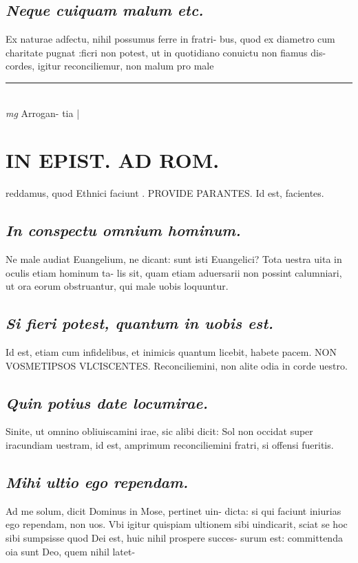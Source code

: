 \documentclass{article}
\begin{document}
\begin{pages}
\subsection*{\textit{Neque cuiquam malum etc. }}\pstart Ex naturae adfectu, nihil possumus ferre in fratri- bus, quod ex diametro cum charitate pugnat :ficri non potest, ut in quotidiano conuictu non fiamus dis- cordes, igitur reconciliemur, non malum pro male  \pend
\vspace{0.5cm}\noindent
\vspace{0.2cm}\rule{1cm}{0.2pt}\\ 
\hspace{0.2cm}\textit{mg}
\footnotesize Arrogan- tia 
\normalsize| 
\section*{IN EPIST. AD ROM.  }
\marginpar{[ p.149 ]}\pstart reddamus, quod Ethnici faciunt . PROVIDE PARANTES. Id est, facientes.  \pend
{}
{}
\subsection*{\textit{In conspectu omnium hominum. }}\pstart Ne male audiat Euangelium, ne dicant: sunt isti Euangelici? Tota uestra uita in oculis etiam hominum ta- lis sit, quam etiam aduersarii non possint calumniari, ut ora eorum obstruantur, qui male uobis loquuntur.  \pend
{}
{}
\subsection*{\textit{Si fieri potest, quantum in uobis est. }}\pstart Id est, etiam cum infidelibus, et inimicis quantum licebit, habete pacem. NON VOSMETIPSOS VLCISCENTES. Reconciliemini, non alite odia in corde uestro.  \pend
{}
{}
\subsection*{\textit{Quin potius date locumirae. }}\pstart Sinite, ut omnino obliuiscamini irae, sic alibi dicit: Sol non occidat super iracundiam uestram, id est, amprimum reconciliemini fratri, si offensi fueritis.   \pend
{}
{}
\subsection*{\textit{Mihi ultio ego rependam. }}\pstart Ad me solum, dicit Dominus in Mose, pertinet uin- dicta: si qui faciunt iniurias ego rependam, non uos. Vbi igitur quispiam ultionem sibi uindicarit, sciat se hoc sibi sumpsisse quod Dei est, huic nihil prospere succes- surum est: committenda oia sunt Deo, quem nihil latet-  \pend
{}
{}

\end{pages}
\end{document}
